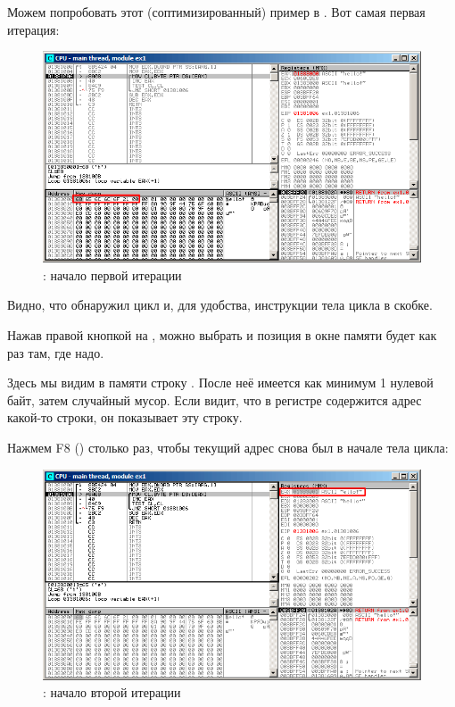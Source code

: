 ﻿\clearpage
{}
\myindex{\olly}

Можем попробовать этот (соптимизированный) пример в \olly.  Вот самая первая итерация:

\begin{figure}[H]
\centering
\includegraphics[scale=\FigScale]{patterns/10_strings/1_strlen/olly1.png}
\caption{\olly: начало первой итерации}
\label{fig:strlen_olly_1}
\end{figure}

Видно, что \olly обнаружил цикл и, для удобства,  инструкции тела цикла в скобке.

Нажав правой кнопкой на \EAX, можно выбрать  
и позиция в окне памяти будет как раз там, где надо.

Здесь мы видим в памяти строку .
После неё имеется как минимум 1 нулевой байт, затем случайный мусор.
Если \olly видит, что в регистре содержится адрес какой-то строки, он показывает эту строку.

\clearpage
Нажмем F8 (\stepover) столько раз, чтобы текущий адрес снова был в начале тела цикла:

\begin{figure}[H]
\centering
\includegraphics[scale=\FigScale]{patterns/10_strings/1_strlen/olly2.png}
\caption{\olly: начало второй итерации}
\label{fig:strlen_olly_2}
\end{figure}

